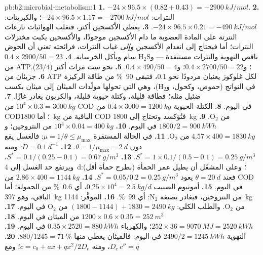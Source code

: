 \begin{solution}{pb:b2:microbial-metabolism:1}
\textbf{1.} $-24\times 96.5\times (0.82 + 0.43) = \qty{-2900}{kJ/mol}$.
\textbf{2.} النترات: $-24\times 96.5\times 1.17 = \qty{-2700}{kJ/mol}$؛
والكبريتات: $-24\times 96.5\times 0.21 = \qty{-490}{kJ/mol}$.
\textbf{3.} يعطي الأكسجين أكثر، فتغلب الهوائيات نازعات النترتة على
المادة العضوية ما دام الأكسجين موجودًا، والأكسجين يكبت مختزلات
النترات؛ أما  فيحتاج إلى انعدام الأكسجين \emph{وإلى}
غياب النترات، فرائحته تعني أن الحوض ناقص التهوية والنترات مستنفدة
--- و$\mathrm{H_2S}$ سام ويأكل الخرسانة.
\textbf{4.} $0.4\times 2900/50 = 23$ من ATP؛ و$0.4\times 2700/50 = 22$؛
و$0.4\times 490/50 = 4$.
\textbf{5.} نحو ست مرات أكثر ($23/4$).
\textbf{6.} جزيئان من ATP لكل غلوكوز يعنيان مردودًا نحو \num{0.1}،
فتبقى \qty{90}{\%} من طاقة الركيزة في النواتج (حموض، وكحول،
و$\mathrm{H_2}$)، وهي التي تحولها مولّدات الميثان إلى ميثان بكسب
ضئيل مثله؛ فطاقة قليلة، وكتلة حيوية قليلة، والكربون يغادر غازًا.
\textbf{7.} $10^4\times 0.3 = \qty{3000}{kg}$ من COD في اليوم.
\textbf{8.} الكتلة الحيوية $0.4\times 3000 = \qty{1200}{kg}$ من COD؛
أما \qty{1800}{kg} الباقية من COD فتُؤكسد وتحتاج إلى \qty{1800}{kg}
من $\mathrm{O_2}$.
\textbf{9.} $1800/2 = \qty{900}{kWh}$ في اليوم.
\textbf{10.} $10^4\times 0.04 = \qty{400}{kg}$ من النتروجين؛
و$4.57\times 400 = \qty{1830}{kg}$ من $\mathrm{O_2}$.
\textbf{11.} في الحالة المستقرة $\mu = 1/\theta \le \mu_{\max}$:
فالغسل يقع دون $\theta = 1/\mu_{\max} = \qty{2}{d}$.
\textbf{12.} $D = \qty{0.1}{d^{-1}}$: ومنه $S^* = 1\times 0.1/(0.5 - 0.1)
= \qty{0.25}{g/m^3}$.
\textbf{13.} $S^* = 0.1/(0.25 - 0.1) = \qty{0.67}{g/m^3}$، ويرتفع حد
الغسل إلى \qty{4}{d}؛ وعلى المشغّل أن يطيل عمر الحمأة (بطرح حمأة
أقل): فعند $\theta = \qty{20}{d}$ يعود $S^* =
0.05/0.2 = \qty{0.25}{g/m^3}$.
\textbf{14.} $2.86\times 400 = \qty{1144}{kg}$ من COD في اليوم.
\textbf{15.} أمونيوم الصبيب $0.25\times 10^4 = \qty{2.5}{kg/d}$، أي
\qty{0.6}{\%} من الحمولة؛ أما الباقي، وهو \qty{397}{kg} من
النتروجين، فيغادر بصيغة $\mathrm{N_2}$: أي \qty{99}{\%}.
\textbf{16.} الموفَّر: \qty{1144}{kg} من $\mathrm{O_2}$. والطلب
الكلي: $(1800 - 1144) + 1830 = \qty{2490}{kg}$ من $\mathrm{O_2}$ في اليوم.
\textbf{17.} $1200\times 0.6\times 0.35 = \qty{252}{m^3}$ من الميثان
في اليوم.
\textbf{18.} $252\times 36 = \qty{9070}{MJ} = \qty{2520}{kWh}$؛
والكهرباء $0.35\times 2520 = \qty{880}{kWh}$ في اليوم.
\textbf{19.} التهوية $2490/2 = \qty{1245}{kWh}$ في اليوم: فالميثان
يغطي منها $880/1245 = \qty{71}{\%}$.
\textbf{20.} $D_e\,c'' = q$، ومنه $c = c_0 + ax + qx^2/2D_e$؛ ومع

\end{solution}
